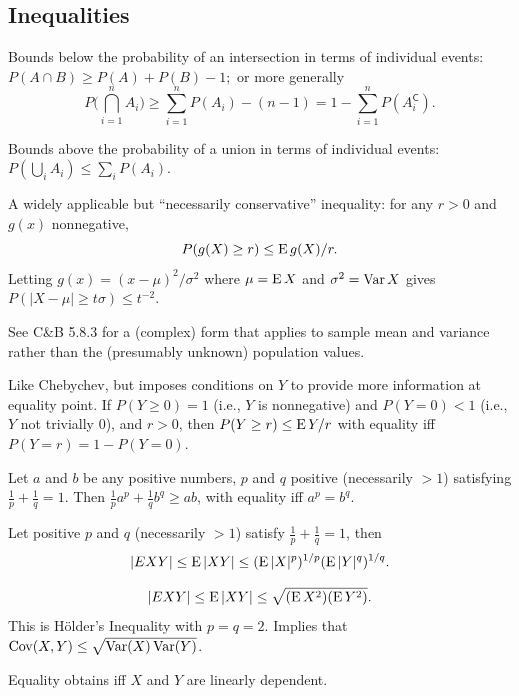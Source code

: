 \documentclass[8pt,letterpaper, landscape]{extarticle} %
\begin{document}
\begin{multicols}{3}
\begin{description}
\subsection{Inequalities}
 Bounds below the probability of an intersection in terms of individual events: $ P(A \cap B) \geq P(A) + P(B) - 1; $ or more generally
$$ P \biggl ( \bigcap_{i=1}^{n} A_i \biggr ) \geq \sum_{i=1}^{n} P(A_i) - (n-1) = 1 - \sum_{i=1}^{n} P(A_i^{\mathsf{C}}). $$

 Bounds above the probability of a union in terms of individual events: $ P \left( \bigcup_i A_i \right) \leq \sum_i P(A_i). $

 A widely applicable but ``necessarily conservative'' inequality: for any $ r>0 $ and $ g(x) $ nonnegative,
$$ P (g(X) \geq r) \leq \operatorname{E} g(X) / r .$$
Letting $ g(x) = (x-\mu)^2/\sigma^2 $ where $ \mu = \operatorname{E} X $ and $ \sigma^2 = \operatorname{Var} X $ gives $ P(|X - \mu | \geq t\sigma) \leq t^{-2} $.

See C\&B 5.8.3 for a (complex) form that applies to sample  mean and variance rather than the (presumably unknown) population values.

 Like Chebychev, but imposes conditions on $ Y $ to provide more information at equality point. If $ P (Y \geq 0) = 1 $ (i.e., $ Y $ is nonnegative) and $ P (Y = 0) < 1 $ (i.e., $ Y $ not trivially 0), and $ r>0 $, then $ P (Y \geq r) \leq \operatorname{E} Y / r $ with equality iff $ P (Y = r) = 1 - P( Y = 0) $.

 Let $ a $ and $ b $ be any positive numbers, $ p $ and $ q $ positive (necessarily $ >1 $) satisfying $ \frac{1}{p} + \frac{1}{q} = 1 $. Then $ \frac{1}{p} a^p + \frac{1}{q} b^q \geq ab $, with equality iff $ a^p = b^q $.

 Let positive $ p $ and $ q $ (necessarily $ >1 $) satisfy $ \frac{1}{p} + \frac{1}{q} = 1 $, then
$$ | E XY | \leq \operatorname{E} |XY| \leq (\operatorname{E} |X|^p)^{1/p} (\operatorname{E} |Y|^q)^{1/q} . $$

$$ | E XY | \leq \operatorname{E} |XY| \leq \sqrt{(\operatorname{E} X^2)(\operatorname{E} Y^2)} . $$
This is H\"{o}lder's Inequality with $ p = q = 2 $. Implies that $ \operatorname{Cov} (X,Y) \leq \sqrt{\operatorname{Var} (X) \operatorname{Var} (Y)} $.

Equality obtains iff $ X $ and $ Y $ are linearly dependent.


\end{description}
\end{multicols}
\end{document}

